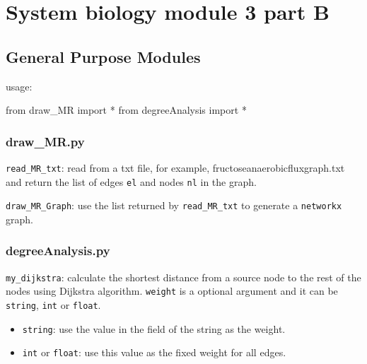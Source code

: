 \documentclass[]{article}
\date{}
\newenvironment{Shaded}{}{}
\newcommand{\ImportTok}[1]{#1}
\newcommand{\OperatorTok}[1]{\textcolor[rgb]{0.40,0.40,0.40}{#1}}
\newcommand{\NormalTok}[1]{#1}
\begin{document}
\hypertarget{header-n3}{%
\section{System biology module 3 part B}\label{header-n3}}

\hypertarget{header-n5}{%
\subsection{General Purpose Modules}\label{header-n5}}

usage:

\begin{Shaded}
\begin{Highlighting}[]
\ImportTok{from}\NormalTok{ draw_MR }\ImportTok{import} \OperatorTok{*}
\ImportTok{from}\NormalTok{ degreeAnalysis }\ImportTok{import} \OperatorTok{*}
\end{Highlighting}
\end{Shaded}

\hypertarget{header-n9}{%
\subsubsection{draw\_MR.py}\label{header-n9}}

\texttt{read\_MR\_txt}: read from a txt file, for example,
fructoseanaerobicfluxgraph.txt and return the list of edges \texttt{el}
and nodes \texttt{nl} in the graph.

\texttt{draw\_MR\_Graph}: use the list returned by
\texttt{read\_MR\_txt} to generate a \texttt{networkx} graph.

\hypertarget{header-n16}{%
\subsubsection{degreeAnalysis.py}\label{header-n16}}

\texttt{my\_dijkstra}: calculate the shortest distance from a source
node to the rest of the nodes using Dijkstra algorithm. \texttt{weight}
is a optional argument and it can be \texttt{string}, \texttt{int} or
\texttt{float}.

\begin{itemize}
\item
  \texttt{string}: use the value in the field of the string as the
  weight.
\item
  \texttt{int} or \texttt{float}: use this value as the fixed weight for
  all edges.
\end{itemize}
\end{document}
